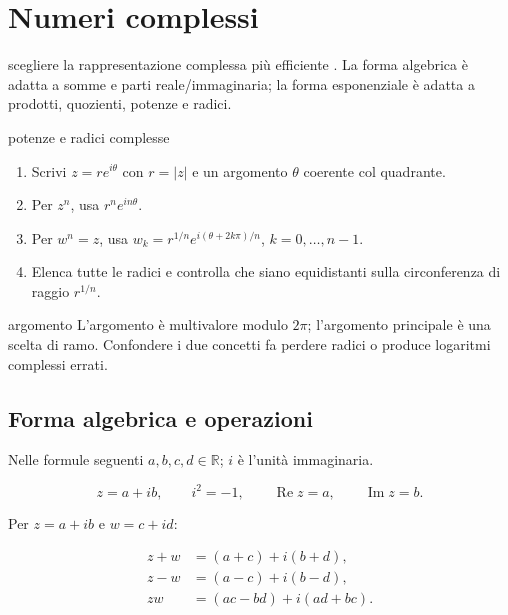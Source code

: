 \chapter{Numeri complessi}
\label{chap:5}

\begin{obiettivocapitolo}{scegliere la rappresentazione complessa più efficiente}
\prioritamedia. La forma algebrica è adatta a somme e parti reale/immaginaria; la forma esponenziale è adatta a prodotti, quozienti, potenze e radici.
\end{obiettivocapitolo}
\begin{proceduraesame}{potenze e radici complesse}
\begin{enumerate}
\item Scrivi $z=re^{i\theta}$ con $r=|z|$ e un argomento $\theta$ coerente col quadrante.
\item Per $z^n$, usa $r^n e^{in\theta}$.
\item Per $w^n=z$, usa $w_k=r^{1/n}e^{i(\theta+2k\pi)/n}$, $k=0,\ldots,n-1$.
\item Elenca tutte le radici e controlla che siano equidistanti sulla circonferenza di raggio $r^{1/n}$.
\end{enumerate}
\end{proceduraesame}
\begin{errorefrequente}{argomento}
L'argomento è multivalore modulo $2\pi$; l'argomento principale è una scelta di ramo. Confondere i due concetti fa perdere radici o produce logaritmi complessi errati.
\end{errorefrequente}

\section{Forma algebrica e operazioni}\label{forma-algebrica-e-operazioni}

Nelle formule seguenti \(a,b,c,d\in\mathbb R\); \(i\) è l'unità immaginaria.

\[
\displaystyle
z=a+ib,
\qquad
i^2=-1,
\qquad
\operatorname{Re}z=a,
\qquad
\operatorname{Im}z=b.
\]

Per \(z=a+ib\) e \(w=c+id\):

\[
\begin{aligned}
z+w&=(a+c)+i(b+d),\\
z-w&=(a-c)+i(b-d),\\
zw&=(ac-bd)+i(ad+bc).
\end{aligned}
\]

